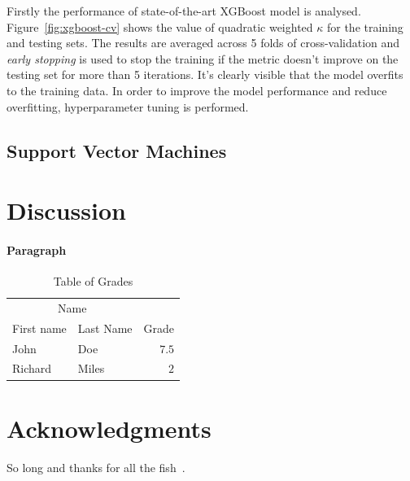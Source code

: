 \documentclass[fleqn,10pt]{SelfArx} %
\begin{document}
Firstly the performance of state-of-the-art XGBoost model is analysed.
Figure~\ref{fig:xgboost-cv} shows the value of quadratic weighted $\kappa$ for the training and testing sets.
The results are averaged across 5 folds of cross-validation and \textit{early stopping} is used to stop the training if the metric doesn't improve on the testing set for more than 5 iterations.
It's clearly visible that the model overfits to the training data.
In order to improve the model performance and reduce overfitting, hyperparameter tuning is performed.

\subsection{Support Vector Machines}



\section{Discussion}

\lipsum[4] %

\paragraph{Paragraph} \lipsum[7] %

\begin{table}
    \caption{Table of Grades}
    \centering
    \begin{tabular}{llr}
        \toprule
        \multicolumn{2}{c}{Name} \\
        \cmidrule(r){1-2}
        First name & Last Name & Grade \\
        \midrule
        John & Doe & $7.5$ \\
        Richard & Miles & $2$ \\
        \bottomrule
    \end{tabular}
    \label{tab:label}
\end{table}

\section*{Acknowledgments} %


So long and thanks for all the fish~\cite{svm}.




\end{document}

